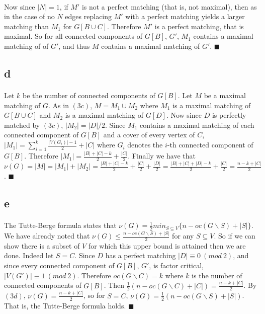 \documentclass[letterpaper,12pt,oneside,onecolumn]{report}
\begin{document}
\paragraph{}
Now since $|N| = 1$, if $M'$ is not a perfect matching (that is, not maximal), then as in the case of no $N$ edges replacing $M'$ with a perfect matching yields a larger matching than $M_1$ for $G[B \cup C]$. Therefore $M'$ is a perfect matching, that is maximal. So for all connected components of $G[B]$, $G'$, $M_1$ contains a maximal matching of of $G'$, and thus $M$ contains a maximal matching of $G'$. $\blacksquare$
\subsection*{d}
\paragraph{}
Let $k$ be the number of connected components of $G[B]$. Let $M$ be a maximal matching of $G$. As in $(3c)$, $M = M_1 \dot\cup M_2$ where $M_1$ is a maximal matching of $G[B \cup C]$ and $M_2$ is a maximal matching of $G[D]$. Now since $D$ is perfectly matched by $(3c)$, $|M_2| = |D|/2$. Since $M_1$ contains a maximal matching of each connected component of $G[B]$ and a cover of every vertex of $C$, $|M_1| = \sum_{i=1}^k \frac{|V(G_i)| -1}{2} + |C|$ where $G_i$ denotes the $i$-th connected component of $G[B]$. Therefore $|M_1| = \frac{|B| + |C| -k}{2} + \frac{|C|}{2}$. Finally we have that $\nu(G) = |M| = |M_1| + |M_2| = \frac{|B| +|C| -k}{2} + \frac{|C|}{2} + \frac{|D|}{2} = \frac{|B| +|C| +|D| -k}{2} + \frac{|C|}{2} = \frac{n - k + |C|}{2}$. $\blacksquare$
\subsection*{e}
\paragraph{}
The Tutte-Berge formula states that $\nu(G) = \frac{1}{2}min_{S \subseteq V} \{n - oc(G\backslash S) + |S|\}$. We have already noted that $\nu(G) \leq \frac{n - oc(G\backslash S) + |S|}{2}$ for any $S \subseteq V$. So if we can show there is a subset of $V$ for which this upper bound is attained then we are done. Indeed let $S = C$. Since $D$ has a perfect matching $|D| \equiv 0\ (mod\ 2)$, and since every connected component of $G[B]$, $G'$, is factor critical, $|V(G')| \equiv 1\ (mod\ 2)$. Therefore $oc(G\backslash C) = k$ where $k$ is the number of connected components of $G[B]$. Then $\frac{1}{2}(n - oc(G\backslash C) + |C|) = \frac{n - k + |C|}{2}$. By $(3d)$, $\nu(G) = \frac{n-k + |C|}{2}$, so for $S=C$, $\nu(G) = \frac{1}{2}(n - oc(G\backslash S) + |S|)$. That is, the Tutte-Berge formula holds. $\blacksquare$
\end{document}
